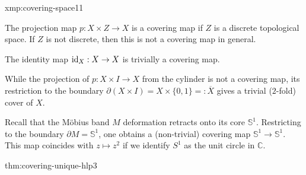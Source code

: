\documentclass[landscape, 8pt]{extarticle}
\begin{document}
\begin{multicols*}{3}
\vspace{-7pt}
\begin{xmp}{xmp:covering-space}{11}
	\vspace{-2pt}
	\begin{enumerate-zero}
	    \item The projection map $p : X \times Z \to X$ is a covering map if $Z$ is a discrete topological space. If $Z$ is not discrete, then this is not a covering map in general.
	    \item The identity map $\operatorname{id}_{X} : X \to X$ is trivially a covering map.
	    \item While the projection of $p : X \times I \to X$ from the cylinder is not a covering map, its restriction to the boundary $\partial(X \times I ) = X \times \{0, 1\} =: \overline{X}$ gives a trivial ($2$-fold) cover of $X$.
	    \item Recall that the M\"obius band $M$ deformation retracts onto its core $\mathbb{S}^{1}$. Restricting to the boundary $\partial M = \mathbb{S}^{1}$, one obtains a (non-trivial) covering map $\mathbb{S}^{1}\to \mathbb{S}^{1}$. This map coincides with $z \mapsto z^{2}$ if we identify $S^{1}$ as the unit circle in $\mathbb{C}$.
	\end{enumerate-zero}
\end{xmp}

\vspace{-7pt}
\begin{thm}{thm:covering-unique-hlp}{3}
	\vspace{-2pt}
	{
	}
	

\end{thm}
\end{multicols*}
\end{document}
